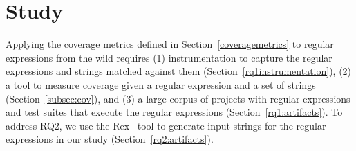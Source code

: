 


\section{Study}
\label{sec:method}
Applying the coverage metrics defined in Section~\ref{coveragemetrics} to 
regular expressions from the wild requires (1) instrumentation to capture the regular expressions and strings matched against them (Section~\ref{rq1instrumentation}), (2) a tool to measure coverage given a regular expression and a set of strings (Section~\ref{subsec:cov}), and  (3) a large corpus of projects with regular expressions and test suites that execute the regular expressions (Section~\ref{rq1:artifacts}). 
To address RQ2, we use the Rex~\cite{rex} tool to generate input strings for the regular expressions in our study (Section~\ref{rq2:artifacts}). 






